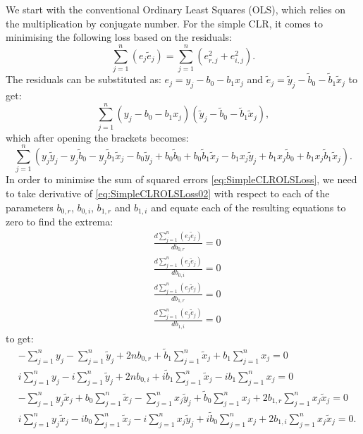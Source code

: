 \documentclass[
]{book}
\begin{document}
We start with the conventional Ordinary Least Squares (OLS), which relies on the multiplication by conjugate number. For the simple CLR, it comes to minimising the following loss based on the residuals:
\begin{equation}
    \sum_{j=1}^n (e_j \tilde{e}_j) = \sum_{j=1}^n (e_{r,j}^2 + e_{i,j}^2).
    \label{eq:SimpleCLROLSLoss}
\end{equation}
The residuals can be substituted as: \(e_j = y_j - b_0 - b_1 x_j\) and \(\tilde{e}_j = \tilde{y}_j - \tilde{b}_0 - \tilde{b}_1 \tilde{x}_j\) to get:
\begin{equation}
    \sum_{j=1}^n (y_j - b_0 - b_1 x_j) (\tilde{y}_j - \tilde{b}_0 - \tilde{b}_1 \tilde{x}_j),
    \label{eq:SimpleCLROLSLoss01}
\end{equation}
which after opening the brackets becomes:
\begin{equation}
    \sum_{j=1}^n \left(y_j \tilde{y}_j - y_j \tilde{b}_0 - y_j \tilde{b}_1 \tilde{x}_j - b_0\tilde{y}_j + b_0 \tilde{b}_0 + b_0 \tilde{b}_1 \tilde{x}_j - b_1 x_j \tilde{y}_j + b_1 x_j \tilde{b}_0 + b_1 x_j \tilde{b}_1 \tilde{x}_j \right) .
    \label{eq:SimpleCLROLSLoss02}
\end{equation}
In order to minimise the sum of squared errors \eqref{eq:SimpleCLROLSLoss}, we need to take derivative of \eqref{eq:SimpleCLROLSLoss02} with respect to each of the parameters \(b_{0,r}\), \(b_{0,i}\), \(b_{1,r}\) and \(b_{1,i}\) and equate each of the resulting equations to zero to find the extrema:
\begin{equation}
    \begin{aligned}
        & \frac{d \sum_{j=1}^n (e_j \tilde{e}_j)}{d b_{0,r}} = 0 \\
        & \frac{d \sum_{j=1}^n (e_j \tilde{e}_j)}{d b_{0,i}} = 0 \\
        & \frac{d \sum_{j=1}^n (e_j \tilde{e}_j)}{d b_{1,r}} = 0 \\
        & \frac{d \sum_{j=1}^n (e_j \tilde{e}_j)}{d b_{1,i}} = 0
    \end{aligned}
    \label{eq:SimpleCLROLSLossSystem01}
\end{equation}
to get:
\begin{equation}
    \begin{aligned}
        & - \sum_{j=1}^n y_j - \sum_{j=1}^n \tilde{y}_j + 2 n b_{0,r} + \tilde{b}_1 \sum_{j=1}^n \tilde{x}_j + {b}_1 \sum_{j=1}^n {x}_j = 0 \\
        & i \sum_{j=1}^n y_j - i \sum_{j=1}^n \tilde{y}_j + 2 n b_{0,i} + i \tilde{b}_1 \sum_{j=1}^n \tilde{x}_j - i {b}_1 \sum_{j=1}^n {x}_j = 0 \\
        & - \sum_{j=1}^n y_j \tilde{x}_j + b_0 \sum_{j=1}^n \tilde{x}_j - \sum_{j=1}^n x_j \tilde{y}_j + \tilde{b}_0 \sum_{j=1}^n {x}_j + 2 b_{1,r} \sum_{j=1}^n x_j \tilde{x}_j = 0 \\
        & i \sum_{j=1}^n y_j \tilde{x}_j - i b_0 \sum_{j=1}^n \tilde{x}_j - i \sum_{j=1}^n x_j \tilde{y}_j + i \tilde{b}_0 \sum_{j=1}^n {x}_j + 2 b_{1,i} \sum_{j=1}^n x_j \tilde{x}_j = 0 .
    \end{aligned}
    \label{eq:SimpleCLROLSLossSystem02}
\end{equation}
\end{document}
